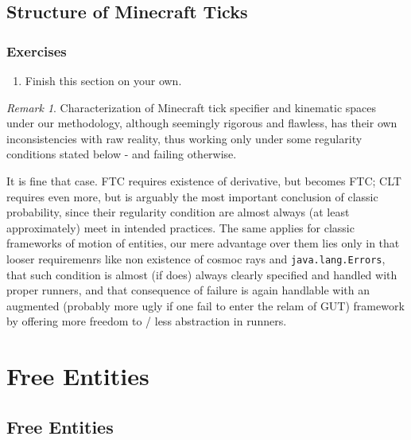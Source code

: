 \documentclass{book}
\theoremstyle{definition}\newtheorem{mechanism}{Mechanism}
\theoremstyle{remark}\newtheorem*{remark}{Remark}
\begin{document}
\section{Structure of Minecraft Ticks}

\subsection*{Exercises}

\begin{enumerate}
	\item Finish this section on your own.
\end{enumerate}

\begin{remark}
	Characterization of Minecraft tick specifier and kinematic spaces under our methodology, although seemingly rigorous and flawless, has their own inconsistencies with raw reality, thus working only under some regularity conditions stated below - and failing otherwise.
	
	It is fine that case. FTC requires existence of derivative, but becomes FTC; CLT requires even more, but is arguably the most important conclusion of classic probability, since their regularity condition are almost always (at least approximately) meet in intended practices. The same applies for classic frameworks of motion of entities, our mere advantage over them lies only in that looser requiremenrs like non existence of cosmoc rays and \texttt{java.lang.Errors}, that such condition is almost (if does) always clearly specified and handled with proper runners, and that consequence of failure is again handlable with an augmented (probably more ugly if one fail to enter the relam of GUT) framework by offering more freedom to / less abstraction in runners.
\end{remark}



\chapter{Free Entities}

\section{Free Entities}
\end{document}
